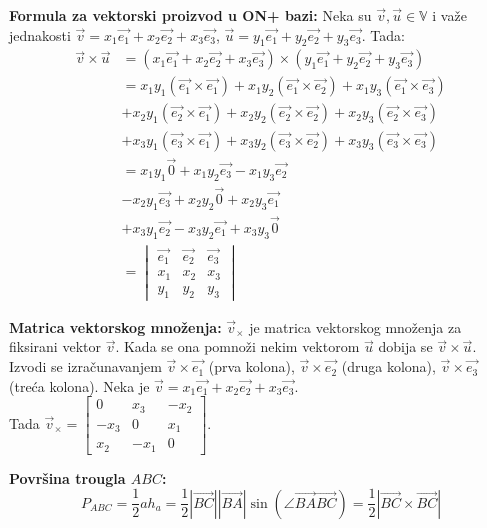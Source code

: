 \documentclass[12pt]{article}
\newcommand{\vek}[1]{\overrightarrow{#1}}
\begin{document}
\textbf{Formula za vektorski proizvod u ON+ bazi:} Neka su $\vek{v},\vek{u}\in
    \mathbb{V}$ i važe jednakosti
$\vek{v}=x_1\vek{e_1}+x_2\vek{e_2}+x_3\vek{e_3}$, $\vek{u}=
    y_1\vek{e_1}+y_2\vek{e_2}+y_3\vek{e_3}$. Tada:
\begin{align*}
    \vek{v}\times\vek{u} & = (x_1\vek{e_1}+x_2\vek{e_2}+x_3\vek{e_3})
    \times(y_1\vek{e_1}+y_2\vek{e_2}+y_3\vek{e_3})                        \\
                         & =x_1y_1(\vek{e_1}\times\vek{e_1})+x_1y_2
    (\vek{e_1}\times\vek{e_2})+x_1y_3(\vek{e_1}\times\vek{e_3})           \\
                         & +x_2y_1(\vek{e_2}\times\vek{e_1})+x_2y_2
    (\vek{e_2}\times\vek{e_2})+x_2y_3(\vek{e_2}\times\vek{e_3})           \\
                         & +x_3y_1(\vek{e_3}\times\vek{e_1})+x_3y_2
    (\vek{e_3}\times\vek{e_2})+x_3y_3(\vek{e_3}\times\vek{e_3})           \\
                         & =x_1y_1\vek{0}+x_1y_2\vek{e_3}-x_1y_3\vek{e_2} \\
                         & -x_2y_1\vek{e_3}+x_2y_2\vek{0}+x_2y_3\vek{e_1} \\
                         & +x_3y_1\vek{e_2}-x_3y_2\vek{e_1}+x_3y_3\vek{0} \\
                         & = \begin{vmatrix}
                                 \vek{e_1} & \vek{e_2} & \vek{e_3} \\
                                 x_1       & x_2       & x_3       \\
                                 y_1       & y_2       & y_3
                             \end{vmatrix}
\end{align*}
\par

\textbf{Matrica vektorskog množenja:} $\vek{v}_\times$ je matrica vektorskog
množenja za fiksirani vektor $\vek{v}$. Kada se ona pomnoži nekim vektorom
$\vek{u}$ dobija se $\vek{v}\times\vek{u}$. Izvodi se izračunavanjem
$\vek{v}\times\vek{e_1}$ (prva kolona), $\vek{v}\times\vek{e_2}$
(druga kolona), $\vek{v}\times\vek{e_3}$ (treća kolona). Neka je
$\vek{v}=x_1\vek{e_1}+x_2\vek{e_2}+x_3\vek{e_3}$.\\
Tada  $\vek{v}_\times=
    \begin{bmatrix}
        0    & x_3  & -x_2 \\
        -x_3 & 0    & x_1  \\
        x_2  & -x_1 & 0
    \end{bmatrix}$.
\par
\textbf{Površina trougla $ABC$:}
$$P_{ABC}=\frac{1}{2}ah_a=\frac{1}{2} |\vek{BC}||\vek{BA}|
    \sin(\angle{\vek{BA}\vek{BC}})=\frac{1}{2} |\vek{BC}\times\vek{BC}|$$
\par
\end{document}
